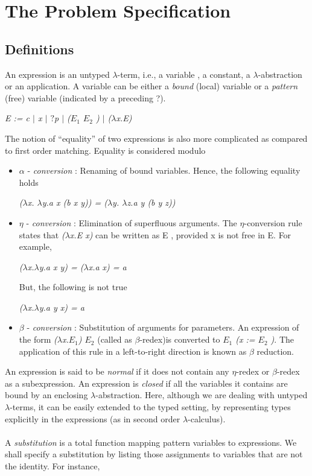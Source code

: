 \section{The Problem Specification}
\subsection{Definitions}
\noindent
An expression is an untyped $\lambda$-term, i.e., a variable , a constant, a $\lambda$-abstraction or an application. A variable can be either a \emph{bound} (local) variable or a \emph{pattern} (free) variable (indicated by a preceding ?).

\begin{center}
\emph{E := c $|$ x $|$ $?$p $|$ ($E_1$ $E_2$ ) $|$ ($\lambda$x.E)}
\end{center}

\noindent
The notion of ``equality'' of two expressions is also more complicated as compared to first order matching. Equality is considered modulo
\begin{itemize}
\item $\alpha$ - \emph{conversion} : Renaming of bound variables. Hence, the following equality holds
\begin{center}
	\emph{($\lambda$x. $\lambda$y.a x (b x y)) = ($\lambda$y. $\lambda$z.a y (b y z))}
\end{center}
\item $\eta$ - \emph{conversion} : Elimination of superfluous arguments. The $\eta$-conversion rule states that \emph{($\lambda$x.E x)} can be written as E , provided x is not free in E. For example,
\begin{center}
	\emph{($\lambda$x.$\lambda$y.a x y) = ($\lambda$x.a x) = a}
\end{center}
But, the following is not true
\begin{center}
\emph{($\lambda$x.$\lambda$y.a y x) = a}
\end{center}
\item $\beta$ - \emph{conversion} : Substitution of arguments for parameters. An expression of the form \emph{($\lambda$x.$E_1$) $E_2$} (called as $\beta$-redex)is converted to \emph{$E_1$ (x := $E_2$ )}. The application of this rule in a left-to-right direction is known as $\beta$ reduction.
\end{itemize}

An expression is said to be \emph{normal} if it does not contain any $\eta$-redex or $\beta$-redex as a subexpression. An expression is \emph{closed} if all the variables it contains are bound by an enclosing $\lambda$-abstraction. Here, although we are dealing with untyped $\lambda$-terms, it can be easily extended to the typed setting, by representing types explicitly in the expressions (as in second order $\lambda$-calculus).\\\\
A \emph{substitution} is a total function mapping pattern variables to expressions. We shall specify a substitution by listing those assignments to variables that are not the identity. For instance,

